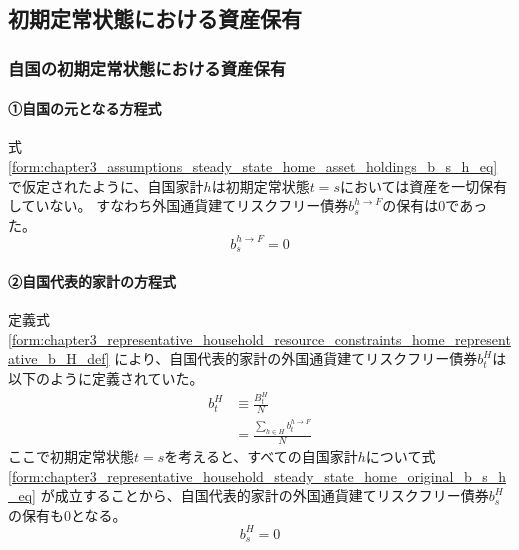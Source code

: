 
\subsection{初期定常状態における資産保有}
\label{sec:chapter3_representative_household_steady_state}

\subsubsection{自国の初期定常状態における資産保有}
\label{sec:chapter3_representative_household_steady_state_home}

\paragraph{①自国の元となる方程式}
\label{sec:chapter3_representative_household_steady_state_home_original}
式
\eqref{form:chapter3_assumptions_steady_state_home_asset_holdings_b_s_h_eq}
で仮定されたように、自国家計\(h\)は初期定常状態\(t=s\)においては資産を一切保有していない。
すなわち外国通貨建てリスクフリー債券\(b_s^{h\to F}\)の保有は0であった。
\begin{equation}
\label{form:chapter3_representative_household_steady_state_home_original_b_s_h_eq}
    b_s^{h\to F}=0
\end{equation}

\paragraph{②自国代表的家計の方程式}
\label{sec:chapter3_representative_household_steady_state_home_representative}
定義式
\eqref{form:chapter3_representative_household_resource_constraints_home_representative_b_H_def}
により、自国代表的家計の外国通貨建てリスクフリー債券\(b_t^H\)は以下のように定義されていた。
\begin{equation}
\label{form:chapter3_representative_household_steady_state_home_representative_b_H_def}
    \begin{aligned}
        b_t^H&\equiv\frac{B_t^H}{N} \\
        &=\frac{\sum_{h\in H}b_t^{h\to F}}{N}
    \end{aligned}
\end{equation}
ここで初期定常状態\(t=s\)を考えると、すべての自国家計\(h\)について式
\eqref{form:chapter3_representative_household_steady_state_home_original_b_s_h_eq}
が成立することから、自国代表的家計の外国通貨建てリスクフリー債券\(b_s^H\)の保有も0となる。
\begin{equation}
\label{form:chapter3_representative_household_steady_state_home_representative_b_s_H_eq}
    b_s^H=0
\end{equation}

